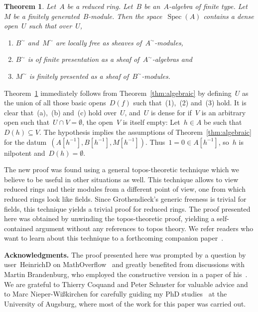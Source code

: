 \documentclass[oneside]{amsart}
\theoremstyle{definition}
\theoremstyle{plain}
\newtheorem{thm}[defn]{Theorem}
\theoremstyle{remark}
\DeclareMathOperator{\Spec}{Spec}
\begin{document}
\begin{thm}\label{thm:geometric}Let~$A$ be a reduced ring. Let~$B$ be
an~$A$-algebra of finite type. Let~$M$ be a finitely generated~$B$-module. Then
the space~$\Spec(A)$ contains a dense open~$U$ such that over~$U$,
\begin{enumerate}
\item[(a)] $B^\sim$ and~$M^\sim$ are locally free as sheaves of~$A^\sim$-modules,
\item[(b)] $B^\sim$ is of finite presentation as a sheaf of~$A^\sim$-algebras and
\item[(c)] $M^\sim$ is finitely presented as a sheaf of~$B^\sim$-modules.
\end{enumerate}
\end{thm}

Theorem~\ref{thm:geometric} immediately follows from
Theorem~\ref{thm:algebraic} by defining~$U$ as the union of all those basic
opens~$D(f)$ such that~(1),~(2) and~(3) hold. It is clear that~(a),~(b)
and~(c) hold over~$U$, and~$U$ is dense for if~$V$ is an arbitrary open
such that~$U \cap V = \emptyset$, the open~$V$ is itself empty: Let~$h \in A$ be
such that~$D(h) \subseteq V$. The hypothesis implies the assumptions of
Theorem~\ref{thm:algebraic} for the datum~$(A[h^{-1}], B[h^{-1}], M[h^{-1}])$.
Thus~$1 = 0 \in A[h^{-1}]$, so~$h$ is nilpotent and~$D(h) = \emptyset$.

The new proof was found using a general topos-theoretic technique which we
believe to be useful in other situations as well. This technique allows to view
reduced rings and their modules from a different point of view, one from which
reduced rings look like fields. Since Grothendieck's generic freeness
is trivial for fields, this technique yields a trivial proof for reduced rings.
The proof presented here was obtained by unwinding the topos-theoretic proof,
yielding a self-contained argument without any references to topos theory.
We refer readers who want to learn about this technique to a forthcoming companion 
paper~\cite{blechschmidt:wlog}.

\textbf{Acknowledgments.} The proof presented here was prompted by a question by
user~HeinrichD on MathOverflow~\cite{mo:kernel} and greatly
benefited from discussions with Martin Brandenburg, who employed the constructive
version in a paper of his~\cite{brandenburg:schur}. We are grateful to Thierry
Coquand and Peter Schuster for valuable advice and to Marc
Nieper-Wißkirchen for carefully guiding my PhD studies~\cite{blechschmidt:phd} at the University of
Augsburg, where most of the work for this paper was carried out.
\end{document}
